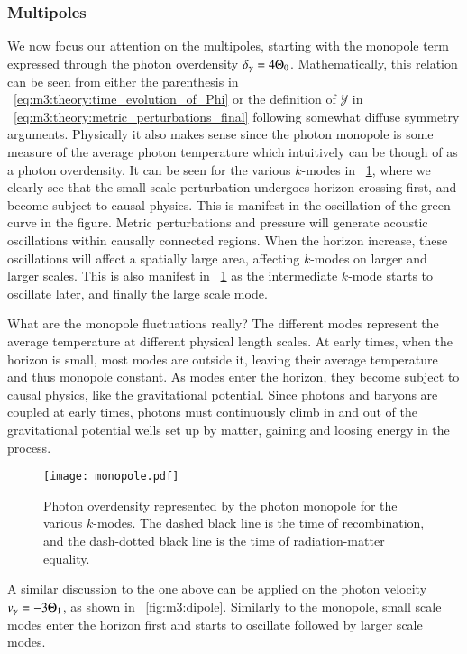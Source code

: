 \subsubsection{Multipoles}
    We now focus our attention on the multipoles, starting with the monopole term expressed through the photon overdensity $\delta_\gamma = 4\Theta_0$. Mathematically, this relation can be seen  from either the parenthesis in ~\cref{eq:m3:theory:time_evolution_of_Phi} or the definition of $\mathcal{Y}$ in ~\cref{eq:m3:theory:metric_perturbations_final} following somewhat diffuse symmetry arguments. Physically it also makes sense since the photon monopole is some measure of the average photon temperature which intuitively can be though of as a photon overdensity. It can be seen for the various $k$-modes in ~\cref{fig:m3:monopole}, where we clearly see that the small scale perturbation undergoes horizon crossing first, and become subject to causal physics. This is manifest in the oscillation of the green curve in the figure. Metric perturbations and pressure will generate acoustic oscillations within causally connected regions. When the horizon increase, these oscillations will affect a spatially large area, affecting $k$-modes on larger and larger scales. This is also manifest in ~\cref{fig:m3:monopole} as the intermediate $k$-mode starts to oscillate later, and finally the large scale mode. 

    What are the monopole fluctuations really? The different modes represent the average temperature at different physical length scales. At early times, when the horizon is small, most modes are outside it, leaving their average temperature and thus monopole constant. As modes enter the horizon, they become subject to causal physics, like the gravitational potential. Since photons and baryons are coupled at early times, photons must continuously climb in and out of the gravitational potential wells set up by matter, gaining and loosing energy in the process. 
    \begin{figure}
        \texttt{[image: monopole.pdf]}
        \caption{Photon overdensity represented by the photon monopole for the various $k$-modes. The dashed black line is the time of recombination, and the dash-dotted black line is the time of radiation-matter equality.}
        \label{fig:m3:monopole}
    \end{figure}


    
    A similar discussion to the one above can be applied on the photon velocity $v_\gamma = -3\Theta_1$, as shown in ~\cref{fig:m3:dipole}. Similarly to the monopole, small scale modes enter the horizon first and starts to oscillate followed by larger scale modes. 

